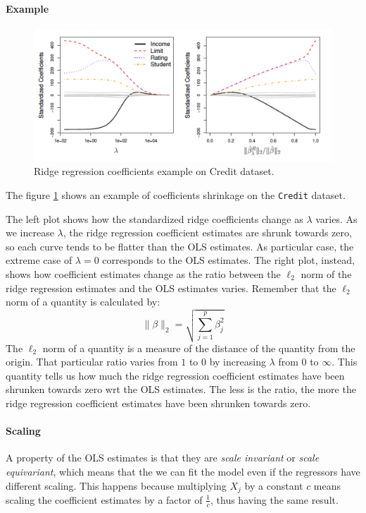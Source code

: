 \paragraph*{Example}
\begin{figure}
    \centering
    \includegraphics[width=0.8\linewidth]{./figures/chapter_4/examplecredit.png}
    \caption{Ridge regression coefficients example on Credit dataset.}
    \label{fig:examplecredit}
\end{figure}
The figure \ref{fig:examplecredit} shows an example of coefficients shrinkage on the \texttt{Credit} dataset. 

The left plot shows how the standardized ridge coefficients change as $\lambda$ varies. As we increase $\lambda$, the ridge regression coefficient estimates are shrunk towards zero, so each curve tends to be flatter than the OLS estimates. As particular case, the extreme case of $\lambda = 0$ corresponds to the OLS estimates.
The right plot, instead, shows how coefficient estimates change as the ratio between the $\ell_2$ norm of the ridge regression estimates and the OLS estimates varies. Remember that the $\ell_2$ norm of a quantity is calculated by:
\[
    \lVert \beta \rVert_2 = \sqrt{\sum_{j=1}^{p} \beta_j^2}
\]
The $\ell_2$ norm of a quantity is a measure of the distance of the quantity from the origin. 
That particular ratio varies from $1$ to $0$ by increasing $\lambda$ from $0$ to $\infty$.
This quantity tells us how much the ridge regression coefficient estimates have been shrunken towards zero wrt the OLS estimates. The less is the ratio, the more the ridge regression coefficient estimates have been shrunken towards zero.

\paragraph*{Scaling}
A property of the OLS estimates is that they are \textit{scale invariant} or \textit{scale equivariant}, which means that the we can fit the model even if the regressors have different scaling. This happens because multiplying $X_j$ by a constant $c$ means scaling the coefficient estimates by a factor of $\frac{1}{c}$, thus having the same result.

